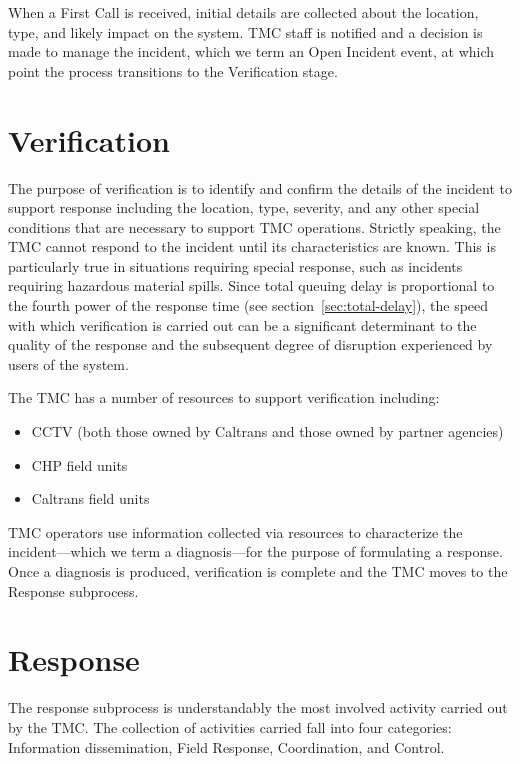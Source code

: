 \documentclass[12pt]{report}
\newcounter{time}
\begin{document}
When a {\sc First Call} is received, initial details are collected about the
location, type, and likely impact on the system.  \ac{TMC} staff is notified and
a decision is made to manage the incident, which we term an {\sc Open Incident}
event, at which point the process transitions to the Verification stage.


\section{Verification}
\label{sec:verification}

The purpose of verification is to identify and confirm the details of the
incident to support response including the location, type, severity, and any
other special conditions that are necessary to support \ac{TMC} operations.
Strictly speaking, the \ac{TMC} cannot respond to the incident until its
characteristics are known.  This is particularly true in situations requiring
special response, such as incidents requiring hazardous material spills.  Since
total queuing delay is proportional to the fourth power of the response time
(see section~\ref{sec:total-delay}), the speed with which verification is
carried out can be a significant determinant to the quality of the response and
the subsequent degree of disruption experienced by users of the system.

The \ac{TMC} has a number of resources to support verification including:
\begin{itemize}
\item CCTV (both those owned by Caltrans and those owned by partner
  agencies)
\item \ac{CHP} field units
\item Caltrans field units
\end{itemize}
\ac{TMC} operators use information collected via resources to characterize the
incident---which we term a diagnosis---for the purpose of formulating a
response.  Once a diagnosis is produced, verification is complete and the
\ac{TMC} moves to the {\sc Response} subprocess.

\section{Response}
\label{sec:response}

The response subprocess is understandably the most involved activity carried out
by the \ac{TMC}.  The collection of activities carried fall into four
categories: Information dissemination, Field Response, Coordination, and
Control.
\end{document}
